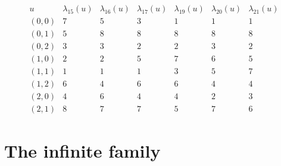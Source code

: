 \documentclass[11pt]{amsart}
\DeclareMathOperator{\Spec}{Spec}
\begin{document}
\begin{table}[ht]
\[
\begin{array}{c|cccccc}
 u & \lambda_{15}(u) & \lambda_{16}(u) & \lambda_{17}(u)
   & \lambda_{19}(u) & \lambda_{20}(u) & \lambda_{21}(u)\\
\hline
(0,0) & 7 & 5 & 3 & 1 & 1 & 1\\
(0,1) & 5 & 8 & 8 & 8 & 8 & 8\\
(0,2) & 3 & 3 & 2 & 2 & 3 & 2\\
(1,0) & 2 & 2 & 5 & 7 & 6 & 5\\
(1,1) & 1 & 1 & 1 & 3 & 5 & 7\\
(1,2) & 6 & 4 & 6 & 6 & 4 & 4\\
(2,0) & 4 & 6 & 4 & 4 & 2 & 3\\
(2,1) & 8 & 7 & 7 & 5 & 7 & 6
\end{array}
\]
\caption{Six $C_4$-face-magic labelings of the L-tromino $L_2$, one for each
value of $\Spec_{C_4}(L_2)=\{15,16,17,19,20,21\}$; $\lambda_s$ has magic
constant $s$. For example $\lambda_{17}$ gives cell $[0,0]$ the sum
$3+5+8+1=17$, cell $[0,1]$ the sum $8+1+2+6=17$ and cell $[1,0]$ the sum
$5+4+1+7=17$.}
\label{tab:L2}
\end{table}

\section{The infinite family}\label{sec:family}
\end{document}
